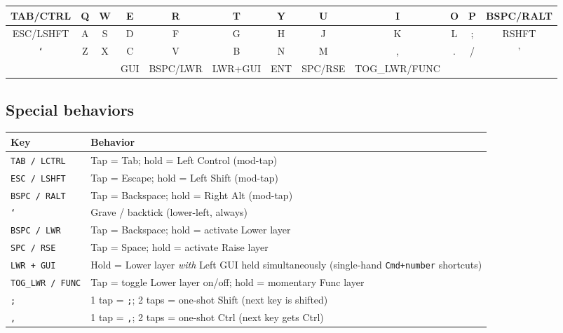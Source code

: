 \documentclass[11pt, letterpaper]{article}
\begin{document}
\begin{center}
\renewcommand{\arraystretch}{1.4}
\begin{tabular}{|c|c|c|c|c|c||c|c|c|c|c|c|}
\hline
TAB/CTRL & Q & W & E & R & T & Y & U & I & O & P & BSPC/RALT \\
\hline
ESC/LSHFT & A & S & D & F & G & H & J & K & L & ; & RSHFT \\
\hline
\texttt{`} & Z & X & C & V & B & N & M & , & . & / & ' \\
\hline
\multicolumn{3}{|c}{} &
GUI &
\multicolumn{1}{|c|}{BSPC/LWR} &
\multicolumn{1}{|c||}{LWR+GUI} &
\multicolumn{1}{c|}{ENT} &
\multicolumn{1}{c|}{SPC/RSE} &
\multicolumn{1}{c|}{TOG\_LWR/FUNC} &
\multicolumn{3}{c}{} \\
\hline
\end{tabular}
\end{center}

\subsection*{Special behaviors}

\begin{tabular}{lp{9cm}}
\toprule
\textbf{Key} & \textbf{Behavior} \\
\midrule
\texttt{TAB / LCTRL}      & Tap = Tab; hold = Left Control (mod-tap) \\
\texttt{ESC / LSHFT}      & Tap = Escape; hold = Left Shift (mod-tap) \\
\texttt{BSPC / RALT}      & Tap = Backspace; hold = Right Alt (mod-tap) \\
\texttt{`}                & Grave / backtick (lower-left, always) \\
\texttt{BSPC / LWR}       & Tap = Backspace; hold = activate Lower layer \\
\texttt{SPC / RSE}        & Tap = Space; hold = activate Raise layer \\
\texttt{LWR + GUI}        & Hold = Lower layer \emph{with} Left GUI held simultaneously (single-hand \texttt{Cmd+number} shortcuts) \\
\texttt{TOG\_LWR / FUNC}  & Tap = toggle Lower layer on/off; hold = momentary Func layer \\
\texttt{;}                & 1 tap = \texttt{;}; 2 taps = one-shot Shift (next key is shifted) \\
\texttt{,}                & 1 tap = \texttt{,}; 2 taps = one-shot Ctrl (next key gets Ctrl) \\
\bottomrule
\end{tabular}
\end{document}
